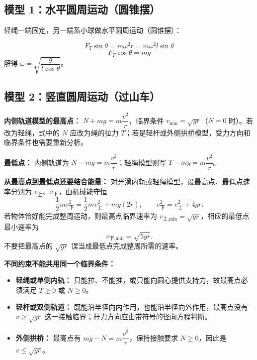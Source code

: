 \subsection*{模型 1：水平圆周运动（圆锥摆）}

轻绳一端固定，另一端系小球做水平圆周运动（圆锥摆）：

\begin{center}


\label{fig:conical-pendulum}
\end{center}

\[
F_T\sin\theta = m\omega^2 r = m\omega^2 l\sin\theta
\]
\[
F_T\cos\theta = mg
\]
解得 $\omega = \sqrt{\dfrac{g}{l\cos\theta}}$。

\subsection*{模型 2：竖直圆周运动（过山车）}

\begin{center}


\label{fig:vertical-circular}
\end{center}

\textbf{内侧轨道模型的最高点：} $N + mg = m\dfrac{v^2}{r}$，临界条件 $v_{\min} = \sqrt{gr}$（$N=0$ 时）。若改为轻绳，式中的 $N$ 应改为绳的拉力 $T$；若是轻杆或外侧拱桥模型，受力方向和临界条件也需要重新分析。

\textbf{最低点：} 内侧轨道为 $N - mg = m\dfrac{v^2}{r}$；轻绳模型则写 $T-mg=m\dfrac{v^2}{r}$。

\textbf{从最高点到最低点还要结合能量：} 对光滑内轨或轻绳模型，设最高点、最低点速率分别为 $v_{\text{上}}$、$v_{\text{下}}$，由机械能守恒
\[
\frac12mv_{\text{下}}^2
=\frac12mv_{\text{上}}^2+mg(2r),
\qquad
v_{\text{下}}^2=v_{\text{上}}^2+4gr.
\]
若物体恰好能完成整周运动，则最高点临界速率为
$v_{\text{上,min}}=\sqrt{gr}$，相应的最低点最小速率为
\[
\boxed{v_{\text{下,min}}=\sqrt{5gr}}.
\]
不要把最高点的 $\sqrt{gr}$ 误当成最低点完成整周所需的速率。

\textbf{不同约束不能共用同一个临界条件：}
\begin{itemize}
  \item \textbf{轻绳或单侧内轨：} 只能拉、不能推，或只能向圆心提供支持力，故最高点必须满足 $T\ge0$ 或 $N\ge0$。
  \item \textbf{轻杆或双侧轨道：} 既能沿半径向内作用，也能沿半径向外作用，最高点没有 $v\ge\sqrt{gr}$ 这一接触临界；杆力方向应由带符号的径向方程判断。
  \item \textbf{外侧拱桥：} 最高点有 $mg-N=m\dfrac{v^2}{r}$，保持接触要求 $N\ge0$，因此是 $v\le\sqrt{gr}$。
\end{itemize}

